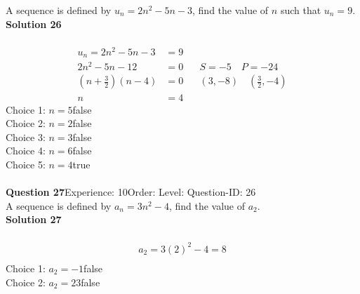 \documentclass{article}
\begin{document}
A sequence is defined by $u_n=2n^2-5n-3$, find the value of $n$ such that $u_n=9$.\\[4pt]
\noindent\textbf{Solution 26}\\[2pt]
\\[-35pt]\begin{align*}
u_n=2n^2-5n-3&=9\\[2pt]
2n^2-5n-12&=0\hspace{20pt}S=-5 \quad P=-24\\[2pt]
\left(n+\displaystyle\frac{3}{2}\right)(n-4)&=0\hspace{20pt} (3,-8)\quad\left(\displaystyle\frac{3}{2},-4\right)\\[2pt]
n&=4
\end{align*}
Choice 1: \hspace{20pt}$n=5$\hspace{20pt}false\\
Choice 2: \hspace{20pt}$n=2$\hspace{20pt}false\\
Choice 3: \hspace{20pt}$n=3$\hspace{20pt}false\\
Choice 4: \hspace{20pt}$n=6$\hspace{20pt}false\\
Choice 5: \hspace{20pt}$n=4$\hspace{20pt}true\\
\\[4pt]
\noindent\textbf{Question 27}\hspace{20pt}Experience: 10\hspace{20pt}Order: \hspace{20pt}Level: \hspace{20pt}Question-ID: 26\\[2pt]
A sequence is defined by $a_n=3n^2-4$, find the value of $a_2$.\\[4pt]
\noindent\textbf{Solution 27}\\[2pt]
\\[-35pt]\begin{align*}
a_2=3(2)^2-4=8\\[2pt]
\end{align*}
Choice 1: \hspace{20pt}$a_2=-1$\hspace{20pt}false\\
Choice 2: \hspace{20pt}$a_2=23$\hspace{20pt}false\\
\end{document}
